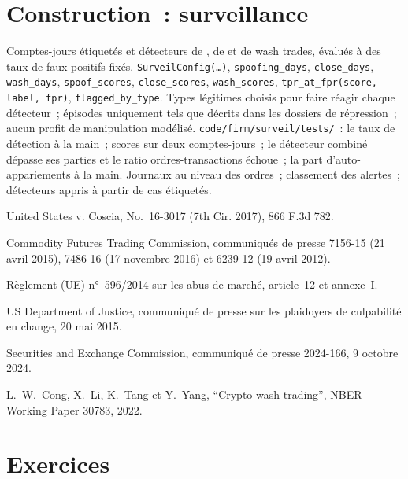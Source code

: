 \section{Construction~: surveillance}\label{bld:s2:manipulative-strategies-and-how-they-are-caught:surveil}

\begin{build}
 Comptes-jours étiquetés et détecteurs de , de  et de wash trades, évalués à des taux de faux positifs fixés.
 \texttt{SurveilConfig(\dots)}, \texttt{spoofing\_days}, \texttt{close\_days}, \texttt{wash\_days}, \texttt{spoof\_scores},
\texttt{close\_scores}, \texttt{wash\_scores}, \texttt{tpr\_at\_fpr(score, label, fpr)}, \texttt{flagged\_by\_type}.
 Types légitimes choisis pour faire réagir chaque détecteur~; épisodes uniquement tels que décrits dans les dossiers de répression~; aucun profit de manipulation modélisé.
 \texttt{code/firm/surveil/tests/}~: le taux de détection à la main~; scores sur deux comptes-jours~; le détecteur combiné dépasse ses parties
et le ratio ordres-transactions échoue~; la part d'auto-appariements à la main.
 Journaux au niveau des ordres~; classement des alertes~; détecteurs appris à partir de cas étiquetés.
\end{build}

\begin{omsources}
\item United States v. Coscia, No.~16-3017 (7th Cir. 2017), 866 F.3d 782.
\item Commodity Futures Trading Commission, communiqués de presse 7156-15 (21 avril 2015), 7486-16 (17 novembre 2016) et 6239-12 (19 avril 2012).
\item Règlement (UE) n°~596/2014 sur les abus de marché, article~12 et annexe~I.
\item US Department of Justice, communiqué de presse sur les plaidoyers de culpabilité en change, 20 mai 2015.
\item Securities and Exchange Commission, communiqué de presse 2024-166, 9 octobre 2024.
\item L.~W.~Cong, X.~Li, K.~Tang et Y.~Yang, ``Crypto wash trading'', NBER Working Paper 30783, 2022.
\end{omsources}

\section{Exercices}

